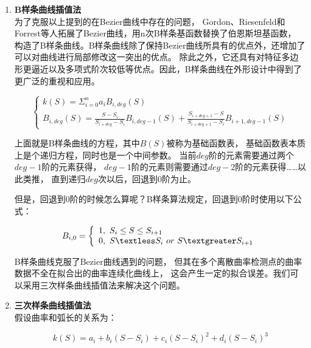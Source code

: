\begin{itemize}
\begin{enumerate}[label=(\Alph*)]
        \item \textbf{B样条曲线插值法} \\
        为了克服以上提到的在Bezier曲线中存在的问题，
        Gordon、Riesenfeld和Forrest等人拓展了Bezier曲线，用n次B样条基函数替换了伯恩斯坦基函数，
        构造了B样条曲线。B样条曲线除了保持Bezier曲线所具有的优点外，还增加了可以对曲线进行局部修改这一突出的优点。
        除此之外，它还具有对特征多边形更逼近以及多项式阶次较低等优点。因此，B样条曲线在外形设计中得到了更广泛的重视和应用。

        \begin{equation}
        \left\{
            \begin{array}{lr}
            k(S) = \Sigma_{i=0}^n a_i B_{i, deg}(S)
        \\
            B_{i, deg}(S) = \frac{S-S_i}{S_{i+deg} - S_i}B_{i, deg-1}(S) +\frac{S_{i + deg +1}-S}{S_{i + deg +1} - S_i}B_{i+1, deg-1}(S) 
            \end{array}
        \right.
        \end{equation}

        上面就是B样条曲线的方程，其中$B(S)$被称为基础函数表，
        基础函数表本质上是个递归方程，同时也是一个中间参数。
        当前$deg$阶的元素需要通过两个$deg-1$阶的元素获得，
        $deg-1$阶的元素则需要通过$deg-2$阶的元素获得……以此类推，
        直到递归$deg$次以后，回退到0阶为止。

        但是，回退到0阶的时候怎么算呢？B样条算法规定，回退到0阶时使用以下公式： 

        \begin{equation}
        B_{i, 0} = \left\{
            \begin{array}{lr}
            1, \ S_i \le S \le S_{i+1}
        \\
            0, \ S \textless S_i \ or \ S \textgreater S_{i+1}
            \end{array}
        \right.
        \end{equation}

        B样条曲线克服了Bezier曲线遇到的问题，
        但其在多个离散曲率检测点的曲率数据不全在拟合出的曲率连续化曲线上，
        这会产生一定的拟合误差。我们可以采用三次样条曲线插值法来解决这个问题。

        \item \textbf{三次样条曲线插值法} \\
        假设曲率和弧长的关系为：

        \begin{equation}
            k(S) =  a_i + b_i (S - S_i) + c_i  (S - S_i)^2 + d_i (S - S_i)^3
        \end{equation}


\end{enumerate}
\end{itemize}
